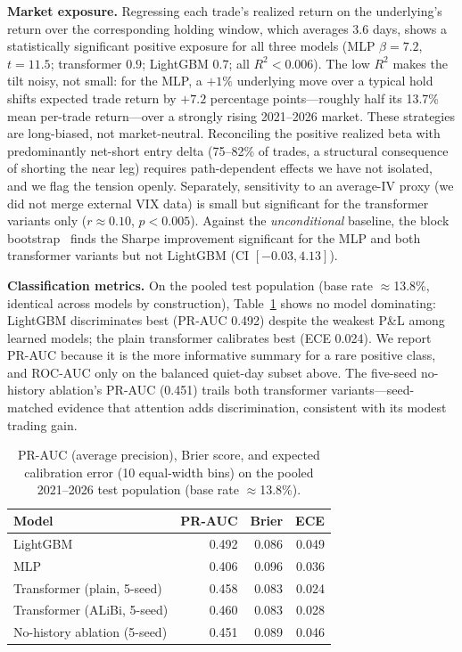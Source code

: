 \documentclass[sigconf,review,anonymous]{acmart}
\begin{document}
\noindent\textbf{Market exposure.} Regressing each trade's realized return on the underlying's return over the corresponding holding window, which averages 3.6 days, shows a statistically significant positive exposure for all three models (MLP $\beta=7.2$, $t=11.5$; transformer $0.9$; LightGBM $0.7$; all $R^2<0.006$). The low $R^2$ makes the tilt noisy, not small: for the MLP, a $+1\%$ underlying move over a typical hold shifts expected trade return by $+7.2$ percentage points---roughly half its 13.7\% mean per-trade return---over a strongly rising 2021--2026 market. These strategies are long-biased, not market-neutral. Reconciling the positive realized beta with predominantly net-short entry delta (75--82\% of trades, a structural consequence of shorting the near leg) requires path-dependent effects we have not isolated, and we flag the tension openly. Separately, sensitivity to an average-IV proxy (we did not merge external VIX data) is small but significant for the transformer variants only ($r\approx0.10$, $p<0.005$). Against the \emph{unconditional} baseline, the block bootstrap~\cite{kunsch1989} finds the Sharpe improvement significant for the MLP and both transformer variants but not LightGBM (CI $[-0.03,4.13]$).

\noindent\textbf{Classification metrics.} On the pooled test population (base rate $\approx$13.8\%, identical across models by construction), Table~\ref{tab:calibration} shows no model dominating: LightGBM discriminates best (PR-AUC 0.492) despite the weakest P\&L among learned models; the plain transformer calibrates best (ECE 0.024). We report PR-AUC because it is the more informative summary for a rare positive class, and ROC-AUC only on the balanced quiet-day subset above. The five-seed no-history ablation's PR-AUC (0.451) trails both transformer variants---seed-matched evidence that attention adds discrimination, consistent with its modest trading gain.

\begin{table}[t]
\centering
\footnotesize
\begin{tabular}{lrrr}
\toprule
Model & PR-AUC & Brier & ECE \\
\midrule
LightGBM & 0.492 & 0.086 & 0.049 \\
MLP & 0.406 & 0.096 & 0.036 \\
Transformer (plain, 5-seed) & 0.458 & 0.083 & 0.024 \\
Transformer (ALiBi, 5-seed) & 0.460 & 0.083 & 0.028 \\
No-history ablation (5-seed) & 0.451 & 0.089 & 0.046 \\
\bottomrule
\end{tabular}
\caption{PR-AUC (average precision), Brier score, and expected calibration error (10 equal-width bins) on the pooled 2021--2026 test population (base rate $\approx$13.8\%).}
\label{tab:calibration}
\end{table}
\end{document}
